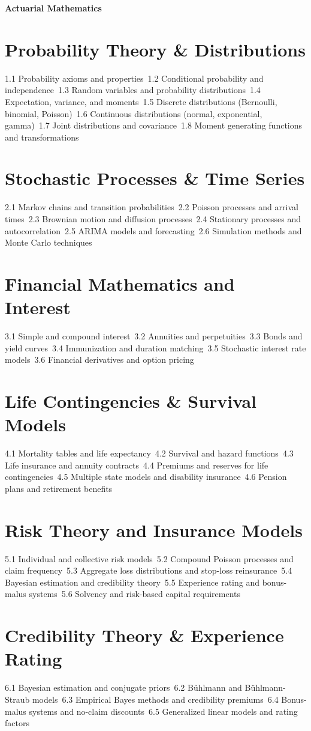 {\LARGE \bf{Actuarial Mathematics}}
\section{Probability Theory \& Distributions}
1.1 Probability axioms and properties\
1.2 Conditional probability and independence\
1.3 Random variables and probability distributions\
1.4 Expectation, variance, and moments\
1.5 Discrete distributions (Bernoulli, binomial, Poisson)\
1.6 Continuous distributions (normal, exponential, gamma)\
1.7 Joint distributions and covariance\
1.8 Moment generating functions and transformations\
\section{Stochastic Processes \& Time Series}
2.1 Markov chains and transition probabilities\
2.2 Poisson processes and arrival times\
2.3 Brownian motion and diffusion processes\
2.4 Stationary processes and autocorrelation\
2.5 ARIMA models and forecasting\
2.6 Simulation methods and Monte Carlo techniques\
\section{Financial Mathematics and Interest}
3.1 Simple and compound interest\
3.2 Annuities and perpetuities\
3.3 Bonds and yield curves\
3.4 Immunization and duration matching\
3.5 Stochastic interest rate models\
3.6 Financial derivatives and option pricing\
\section{Life Contingencies \& Survival Models}
4.1 Mortality tables and life expectancy\
4.2 Survival and hazard functions\
4.3 Life insurance and annuity contracts\
4.4 Premiums and reserves for life contingencies\
4.5 Multiple state models and disability insurance\
4.6 Pension plans and retirement benefits\
\section{Risk Theory and Insurance Models}
5.1 Individual and collective risk models\
5.2 Compound Poisson processes and claim frequency\
5.3 Aggregate loss distributions and stop-loss reinsurance\
5.4 Bayesian estimation and credibility theory\
5.5 Experience rating and bonus-malus systems\
5.6 Solvency and risk-based capital requirements\
\section{Credibility Theory \& Experience Rating}
6.1 Bayesian estimation and conjugate priors\
6.2 Bühlmann and Bühlmann-Straub models\
6.3 Empirical Bayes methods and credibility premiums\
6.4 Bonus-malus systems and no-claim discounts\
6.5 Generalized linear models and rating factors\
